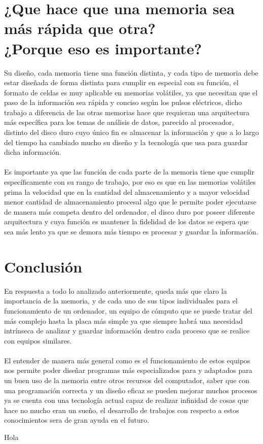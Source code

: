 \documentclass{article}
\begin{document}
	
	\section{¿Que hace que una memoria sea más rápida que otra?\\¿Porque eso es importante?} \label{que}
	Su diseño, cada memoria tiene una función distinta, y cada tipo de memoria debe estar diseñada de forma distinta para cumplir en especial con su función,\cite{youbioit} el formato de celdas es muy aplicable en memorias volátiles, ya que necesitan que el paso de la información sea rápida y conciso según los pulsos eléctricos, dicho trabajo a diferencia de las otras memorias hace que requieran una arquitectura más específica para los temas de análisis de datos, parecido al procesador, distinto del disco duro cuyo único fin es almacenar la información y que a lo largo del tiempo ha cambiado mucho su diseño y la tecnología que usa para guardar dicha información.
	\\\\
	Es importante ya que las función de cada parte de la memoria tiene que cumplir específicamente con su rango de trabajo, por eso es que en las memorias volátiles prima la velocidad que en la cantidad del almacenamiento y a mayor velocidad menor cantidad de almacenamiento procesal algo que le permite poder ejecutarse de manera más competa dentro del ordenador, el disco duro por poseer diferente arquitectura y cuya función es mantener la fidelidad de los datos se espera que sea más lento ya que se demora más tiempo es procesar y guardar la información.
	
	\newpage
	
	\section{Conclusión} \label{conclusion}
	En respuesta a todo lo analizado anteriormente, queda más que claro la importancia de la memoria, y de cada uno de sus tipos individuales para el funcionamiento de un ordenador, un equipo de cómputo que se puede tratar del más complejo hasta la placa más simple ya que siempre habrá una necesidad intrínseca de analizar y guardar información dentro cada proceso que se realice con equipos similares.
	\\\\
	El entender de manera más general como es el funcionamiento de estos equipos nos permite poder diseñar programas más especializados para y adaptados para un buen uso de la memoria entre otros recursos del computador, saber que con una programación correcta y un diseño eficaz se pueden mejorar muchos procesos ya se cuenta con una tecnología actual capaz de realizar infinidad de cosas que hace no mucho eran un sueño, el desarrollo de trabajos con respecto a estos conocimientos sera de gran ayuda en el futuro.
	
	\newpage
	
		
	
	Hola
	
\end{document}
